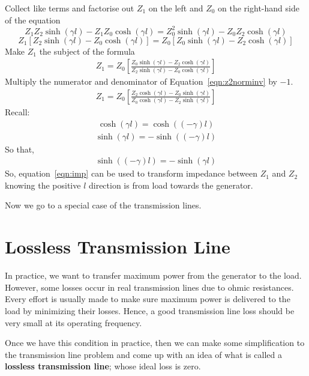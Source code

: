 Collect like terms and factorise out $Z_1$ on the left and $Z_0$ on the right-hand side of the equation
\begin{dmath*}
Z_1Z_2\sinh(\gamma l) - Z_1Z_0\cosh(\gamma l) = Z_0^2\sinh(\gamma l) - Z_0Z_2\cosh(\gamma l)
\end{dmath*}
\begin{dmath*}
Z_1\left[Z_2\sinh(\gamma l) - Z_0\cosh(\gamma l)\right] = Z_0\left[Z_0\sinh(\gamma l) - Z_2\cosh(\gamma l)\right]
\end{dmath*}
Make $Z_1$ the subject of the formula
\begin{align}
Z_1 = Z_0\left[\frac{Z_0\sinh(\gamma l) - Z_2\cosh(\gamma l)}{Z_2\sinh(\gamma l) - Z_0\cosh(\gamma l)}\right]
\label{eqn:z2norminv}
\end{align}
Multiply the numerator and denominator of Equation~\ref{eqn:z2norminv} by $-1$.
\begin{align*}
Z_1 = Z_0\left[\frac{Z_2\cosh(\gamma l) - Z_0\sinh(\gamma l)}{Z_0\cosh(\gamma l) - Z_2\sinh(\gamma l)}\right]
\end{align*}
Recall:
\begin{align*}
\cosh(\gamma l) = \cosh((-\gamma) l)
\end{align*}
\begin{align*}
\sinh(\gamma l) = -\sinh((-\gamma) l)
\end{align*}
So that,
\begin{align*}
\sinh((-\gamma) l) = -\sinh(\gamma l)
\end{align*}
So, equation~\ref{eqn:imp} can be used to transform impedance between $Z_1$ and $Z_2$ knowing the positive $l$ direction is from load towards the generator.

Now we go to a special case of the transmission lines.

\section{Lossless Transmission Line}
In practice, we want to transfer maximum power from the generator to the load. However, some losses occur in real transmission lines due to ohmic resistances. Every effort is usually made to make sure maximum power is delivered to the load by minimizing their losses. Hence, a good transmission line loss should be very small at its operating frequency. 

Once we have this condition in practice, then we can make some simplification to the transmission line problem and come up with an idea of what is called a \textbf{lossless transmission line}; whose ideal loss is zero.

